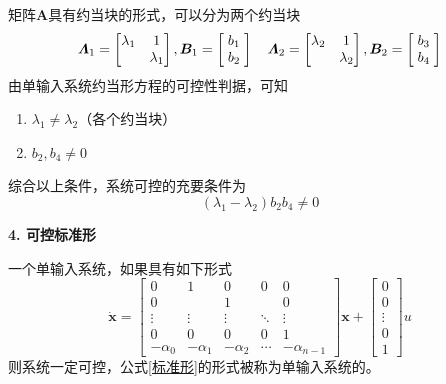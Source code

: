 \solve 矩阵$\bm{A}$具有约当块的形式，可以分为两个约当块
\begin{equation*}
	\bm{\varLambda}_1 = 
	\begin{bmatrix}
		\lambda_1 & 1\\
		& \lambda_1
	\end{bmatrix},
	\bm{B}_1 = 
	\begin{bmatrix}
		\hspace*{1mm}	b_1 \hspace*{1mm}\\
		b_2\\
	\end{bmatrix}\quad 
	\bm{\varLambda}_2 =
	\begin{bmatrix}
		\lambda_2 & 1\\
		& \lambda_2
	\end{bmatrix},	
	\bm{B}_2 = 
	\begin{bmatrix}
	\hspace*{1mm}	b_3 \hspace*{1mm}\\
	b_4\\
	\end{bmatrix}
\end{equation*}
	由单输入系统约当形方程的可控性判据，可知
	\begin{enumerate}[\hspace*{2em} (1)]
		\item $\lambda_1 \neq \lambda_2$（各个约当块）
		\item $b_2,b_4 \neq 0$
	\end{enumerate}
	综合以上条件，系统可控的充要条件为
	\begin{equation*}
		(\lambda_1 - \lambda_2 )b_2b_4 \neq 0
	\end{equation*}
\vspace*{0.5em}

\noindent \textbf{4. 可控标准形}

一个单输入系统，如果具有如下形式
\begin{equation}
	\dot{\bm{x}} = 
	\begin{bmatrix}
		0 & 1 & 0 & 0 & 0 \\
		0 &   & 1 &   & 0\\
		\vdots & \vdots & \vdots & \ddots & \vdots\\
		0 & 0 & 0 & 0 & 1\\
		-\alpha_0 & -\alpha_1 & -\alpha_2 & \cdots & - \alpha_{n-1} 
	\end{bmatrix}
	\bm{x} +
	\begin{bmatrix}
		0\\
		0\\
		\vdots\\
		0\\
		1
	\end{bmatrix}
	u
	\label{标准形}
\end{equation}
则系统一定可控，公式\eqref{标准形}的形式被称为单输入系统的。
\vspace*{1em}

